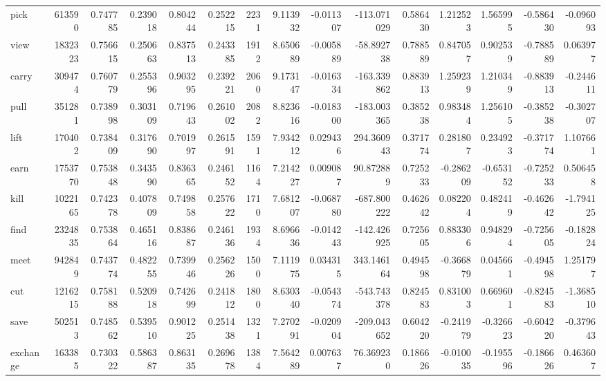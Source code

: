 \begin{tabular}{lrrrrrrrrrrrrrr}
pick      &    613590 &  0.747785 &      0.239018 &    0.804244 &  0.252215 &  2231 &  9.113932 & -0.011307 & -113.071029 &  0.586430 &  1.212523 &  1.565995 &     -0.586430 &        -0.096093 \\
view      &   1832323 &  0.756615 &      0.250663 &    0.837513 &  0.243385 &  1912 &  8.650689 & -0.005889 &  -58.892738 &  0.788589 &  0.847057 &  0.902539 &     -0.788589 &         0.063977 \\
carry     &    309474 &  0.760779 &      0.255396 &    0.903295 &  0.239221 &  2060 &  9.173147 & -0.016334 & -163.339862 &  0.883913 &  1.259239 &  1.210349 &     -0.883913 &        -0.244611 \\
pull      &    351281 &  0.738998 &      0.303109 &    0.719643 &  0.261002 &  2082 &  8.823616 & -0.018300 & -183.003365 &  0.385238 &  0.983484 &  1.256105 &     -0.385238 &        -0.302707 \\
lift      &    170402 &  0.738409 &      0.317690 &    0.701997 &  0.261591 &  1591 &  7.934212 &  0.029436 &  294.360943 &  0.371774 &  0.281807 &  0.234923 &     -0.371774 &         1.107661 \\
earn      &   1753770 &  0.753848 &      0.343590 &    0.836365 &  0.246152 &  1164 &  7.214227 &  0.009087 &   90.872889 &  0.725233 & -0.286209 & -0.653152 &     -0.725233 &         0.506458 \\
kill      &   1022165 &  0.742378 &      0.407809 &    0.749858 &  0.257622 &  1710 &  7.681207 & -0.068780 & -687.800222 &  0.462642 &  0.082204 &  0.482419 &     -0.462642 &        -1.794125 \\
find      &   2324835 &  0.753864 &      0.465116 &    0.838687 &  0.246136 &  1934 &  8.696636 & -0.014243 & -142.426925 &  0.725605 &  0.883306 &  0.948294 &     -0.725605 &        -0.182824 \\
meet      &    942849 &  0.743774 &      0.482255 &    0.739946 &  0.256226 &  1500 &  7.111975 &  0.034315 &  343.146164 &  0.494598 & -0.366879 &  0.045661 &     -0.494598 &         1.251797 \\
cut       &   1216215 &  0.758188 &      0.520918 &    0.742699 &  0.241812 &  1800 &  8.630340 & -0.054374 & -543.743378 &  0.824583 &  0.831003 &  0.669601 &     -0.824583 &        -1.368510 \\
save      &    502513 &  0.748562 &      0.539510 &    0.901225 &  0.251438 &  1321 &  7.270291 & -0.020904 & -209.043652 &  0.604220 & -0.241979 & -0.326623 &     -0.604220 &        -0.379643 \\
exchange  &    163385 &  0.730322 &      0.586387 &    0.863135 &  0.269678 &  1384 &  7.564289 &  0.007637 &   76.369230 &  0.186626 & -0.010035 & -0.195596 &     -0.186626 &         0.463607 \\

\end{tabular}
